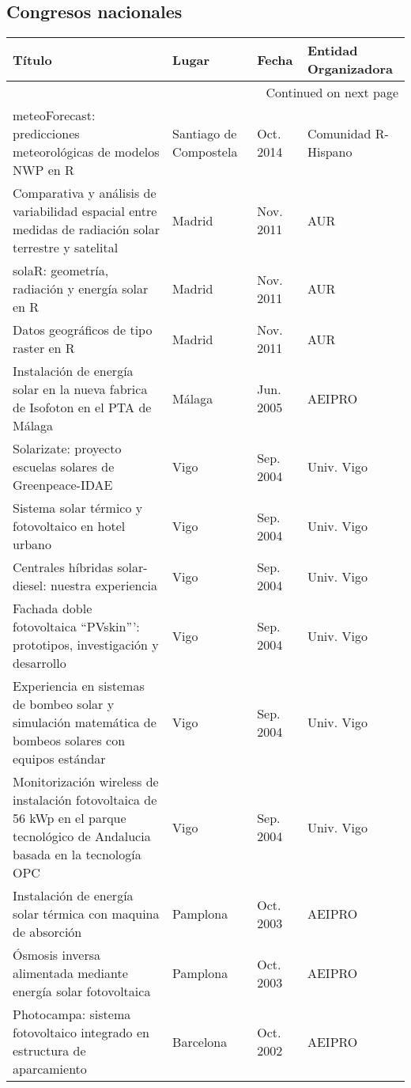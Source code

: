 \documentclass[article, a4paper]{memoir}
\begin{document}
\subsection{Congresos nacionales}
\label{sec-6-2}
\begin{longtable}{p{87mm}|p{30mm}|p{15mm}|p{30mm}}
Título & Lugar & Fecha & Entidad Organizadora\\
\hline
\endhead
\hline\multicolumn{4}{r}{Continued on next page} \\
\endfoot
\endlastfoot
meteoForecast: predicciones meteorológicas de modelos NWP en R & Santiago de Compostela & Oct. 2014 & Comunidad R-Hispano\\
Comparativa y análisis de variabilidad espacial entre medidas de radiación solar terrestre y satelital & Madrid & Nov. 2011 & AUR\\
solaR: geometría, radiación y energía solar en R & Madrid & Nov. 2011 & AUR\\
Datos geográficos de tipo raster en R & Madrid & Nov. 2011 & AUR\\
Instalación de energía solar en la nueva fabrica de Isofoton en el PTA de Málaga & Málaga & Jun. 2005 & AEIPRO\\
Solarizate: proyecto escuelas solares de Greenpeace-IDAE & Vigo & Sep. 2004 & Univ. Vigo\\
Sistema solar térmico y fotovoltaico en hotel urbano & Vigo & Sep. 2004 & Univ. Vigo\\
Centrales híbridas solar-diesel: nuestra experiencia & Vigo & Sep. 2004 & Univ. Vigo\\
Fachada doble fotovoltaica ``PVskin''': prototipos, investigación y desarrollo & Vigo & Sep. 2004 & Univ. Vigo\\
Experiencia en sistemas de bombeo solar y simulación matemática de bombeos solares con equipos estándar & Vigo & Sep. 2004 & Univ. Vigo\\
Monitorización wireless de instalación fotovoltaica de 56 kWp en el parque tecnológico de Andalucia basada en la tecnología OPC & Vigo & Sep. 2004 & Univ. Vigo\\
Instalación de energía solar térmica con maquina de absorción & Pamplona & Oct. 2003 & AEIPRO\\
Ósmosis inversa alimentada mediante energía solar fotovoltaica & Pamplona & Oct. 2003 & AEIPRO\\
Photocampa: sistema fotovoltaico integrado en estructura de aparcamiento & Barcelona & Oct. 2002 & AEIPRO\\
\end{longtable}
\end{document}
